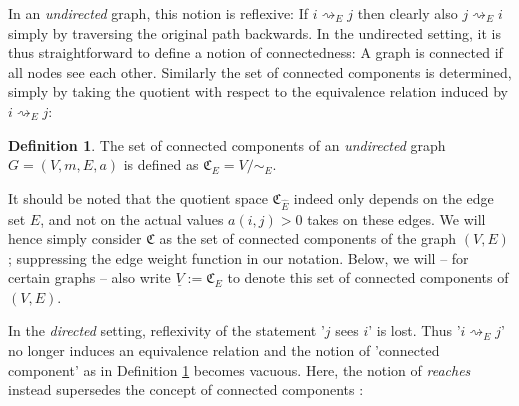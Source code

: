 \documentclass[reqno,12pt,letterpaper]{amsart}
\numberwithin{equation}{section}
\newcommand{\1}{\mathds{1}}
\theoremstyle{definition}
\newtheorem{Def}[Th]{Definition}
\begin{document}
\medskip

In an \emph{undirected} graph,
 this notion
 is reflexive: If $i \rightsquigarrow_E j$ then clearly also  $j \rightsquigarrow_E i$ simply by traversing the original path
 backwards.
 In the undirected setting, it is thus straightforward to define a notion of connectedness: A graph is connected if all nodes see each other. Similarly the set of connected components is determined, simply by taking the quotient with respect to the equivalence relation induced by $i \rightsquigarrow_E j$:


\begin{Def}\label{connected_components}
	The set of connected components of  an \emph{undirected} graph $G = (V, m, E, a)$
is defined as	$\mathfrak{C}_{E} = V/ \sim_{E}$. 
\end{Def}
It should be noted that the quotient space $\mathfrak{C}_{\hat{E}}$ indeed only depends on the edge set $E$, and not on the actual values $a(i,j) > 0$ takes on these edges. We will hence simply consider $\mathfrak{C}$ as the set of connected components of the graph $(V, E)$; suppressing the edge weight function in our notation.
Below, we will -- for certain graphs -- also write $\underline{V}:= \mathfrak{C}_{E} $ to denote this set of connected components of $(V, E)$.

\medskip

In the \emph{directed} setting, reflexivity of the statement '$j$ sees $i$'
  is lost. Thus '$i \rightsquigarrow_E j$' no longer induces an equivalence relation and the notion of 'connected component' as in Definition \ref{connected_components} becomes vacuous. Here, the notion of \emph{reaches} instead supersedes the concept of connected components \cite{caughveer,veerkumm, Veerman2020APO}:
\end{document}
